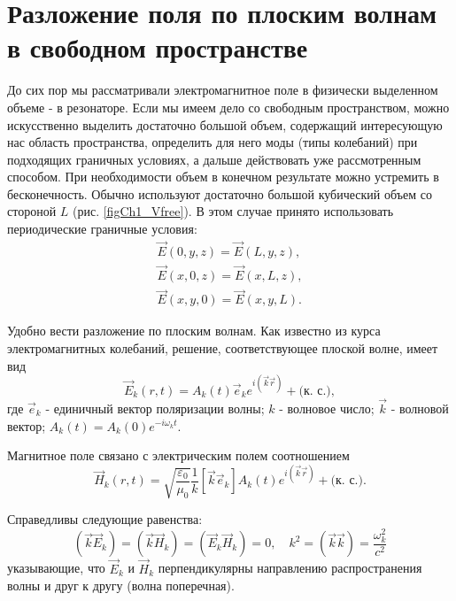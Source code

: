 \section{Разложение поля по плоским волнам в свободном пространстве}
До сих пор мы рассматривали электромагнитное поле в физически
выделенном объеме - в резонаторе. Если мы имеем дело со свободным
пространством, можно искусственно выделить достаточно большой объем,
содержащий интересующую нас область пространства, определить для него
моды (типы колебаний) при подходящих граничных условиях, а дальше
действовать уже рассмотренным способом. При необходимости объем в
конечном результате можно устремить в бесконечность. Обычно используют
достаточно большой кубический объем со стороной  $L$  
(рис. \ref{figCh1_Vfree}). В этом случае принято использовать
периодические граничные условия:  
\begin{eqnarray}
\vec{E}\left(0, y, z \right) = \vec{E}\left(L, y, z \right),
\nonumber \\
\vec{E}\left(x, 0, z \right) = \vec{E}\left(x, L, z \right),
\nonumber \\
\vec{E}\left(x, y, 0 \right) = \vec{E}\left(x, y, L \right).
\label{eqCh1_period_def}
\end{eqnarray}



Удобно вести разложение по плоским волнам. Как известно из курса
электромагнитных колебаний, решение, соответствующее плоской волне,
имеет вид 
\begin{equation}
\vec{E}_k\left(r, t\right) = 
A_k\left(t\right)\vec{e}_k e^{i\left(\vec{k}\vec{r}\right)} +
\mbox{(к. с.)},
\label{eqCh1_Emode}
\end{equation}
где $\vec{e}_k$ - единичный вектор поляризации волны;  
$k$ - волновое число; $\vec{k}$ - волновой вектор;  
$A_k\left(t\right) = A_k\left(0\right) e^{-i \omega_k t}$.

Магнитное поле связано с электрическим полем соотношением
\begin{equation}
\vec{H}_k\left(r, t\right) =
\sqrt{\frac{\varepsilon_0}{\mu_0}}
\frac{1}{k}\left[\vec{k} \vec{e}_k\right] A_k\left(t\right) 
e^{i\left(\vec{k}\vec{r}\right)} + \mbox{(к. с.)}
.
\label{eqCh1_Hmode}
\end{equation}

Справедливы следующие равенства:
\begin{equation}
\left(\vec{k}\vec{E}_k\right) = 
\left(\vec{k}\vec{H}_k\right) = 
\left(\vec{E}_k\vec{H}_k\right) = 0,
\quad
k^2 = \left(\vec{k}\vec{k}\right) = 
\frac{\omega_k^2}{c^2} 
\end{equation}
указывающие, что 
$\vec{E}_k$
и $\vec{H}_k$ перпендикулярны направлению распространения волны и друг
к другу (волна поперечная). 

